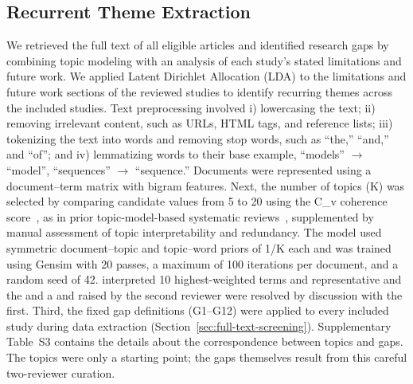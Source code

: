 \subsection{Recurrent Theme Extraction}
We retrieved the full text of all eligible articles and identified research gaps by combining topic modeling with an analysis of each study's stated limitations and future work. We applied Latent Dirichlet Allocation (LDA) \cite{blei2003latent} to the limitations and future work sections of the reviewed studies to identify recurring themes across the included studies. Text preprocessing involved i) lowercasing the text; ii) removing irrelevant content, such as URLs, HTML tags, and reference lists; iii) tokenizing the text into words and removing stop words, such as ``the,'' ``and,'' and ``of''; and iv) lemmatizing words \cite{khyani2021interpretation} to their base  example, ``models'' $\rightarrow$ ``model'', ``sequences'' $\rightarrow$ ``sequence.'' Documents were represented using a document--term matrix with bigram features. Next, the number of topics (K) was selected by comparing candidate values from 5 to 20 using the C\_v coherence score~\cite{roder2015exploring}, as in prior topic-model-based systematic reviews~\cite{ogunleye2024systematic}, supplemented by manual assessment of topic interpretability and redundancy. The model used symmetric document--topic and topic--word priors of 1/K each and was trained using Gensim \cite{rehurek2010gensim} with 20 passes, a maximum of 100 iterations per document, and a random seed of 42.   interpreted    10 highest-weighted terms and representative  and  the   and  a       and       raised by the second reviewer were resolved by discussion with the first. Third, the fixed gap definitions (G1--G12) were applied to every included study during data extraction (Section~\ref{sec:full-text-screening}). Supplementary Table~S3 contains the details about the correspondence between topics and gaps. The topics were only a starting point; the gaps themselves result from this careful two-reviewer curation.

